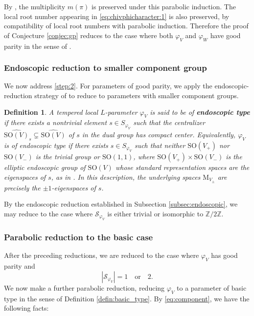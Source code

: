 \documentclass[12pt]{amsart}
\numberwithin{equation}{subsection}
\newcommand{\BZ}{{\mathbb {Z}}}
\newcommand{\CS}{{\mathcal {S}}}
\newcommand{\RM}{{\mathrm {M}}}
\newcommand{\SO}{{\mathrm{SO}}}
\newcommand{\wh}{\widehat}
\def\vphi{\varphi}
\def\SO{\mathrm{SO}}
\newtheorem{defin}[thm]{Definition}
\begin{document}
By \cite[Cor.~7.3.1]{thesis_zhilin}, the multiplicity $m(\pi)$ is preserved
under this parabolic induction. The local root number appearing in
\eqref{eq:chivphicharacter:1} is also preserved, by compatibility of local
root numbers with parabolic induction. Therefore the proof of Conjecture
\ref{conjec:gp} reduces to the case where both $\vphi_V$ and $\vphi_W$ have
good parity in the sense of \cite[\S 4]{moeglin2020paquets}.

\subsubsection{Endoscopic reduction to smaller component group}

We now address \eqref{step:2}. For parameters of good parity, we apply the
endoscopic-reduction strategy of \cite{MR3155345} to reduce to parameters with
smaller component groups.

\begin{defin}\label{def:endoscopic}
A tempered local $L$-parameter $\vphi_V$ is said to be of
\textbf{endoscopic type} if there exists a nontrivial element
$s\in S_{\vphi_V}$ such that the centralizer
$\wh{\SO(V)}_s \subsetneq \wh{\SO(V)}$ of $s$ in the dual group has compact
center. Equivalently, $\vphi_V$ is of endoscopic type if there exists
$s\in S_{\vphi_V}$ such that neither $\SO(V_+)$ nor $\SO(V_-)$ is the trivial
group or $\SO(1,1)$, where $\SO(V_+)\times \SO(V_-)$ is the elliptic
endoscopic group of $\SO(V)$ whose standard representation spaces are the
eigenspaces of $s$, as in \cite{MR2672539}. In this description, the
underlying spaces $\RM_{V_\pm}$ are precisely the $\pm 1$-eigenspaces of $s$.
\end{defin}

By the endoscopic reduction established in Subsection \ref{subsec:endoscopic}, we may reduce to the case where $\CS_{\vphi_V}$ is either trivial or isomorphic to $\BZ/2\BZ$.

\subsubsection{Parabolic reduction to the basic case}

After the preceding reductions, we are reduced to the case where $\vphi_V$ has
good parity and
\[
|\CS_{\vphi_V}|=1\quad\text{or}\quad 2.
\]
We now make a further parabolic reduction, reducing $\vphi_V$ to a parameter
of basic type in the sense of Definition \ref{defin:basic_type}. By 
\eqref{eq:component}, we have the following facts:
\end{document}
